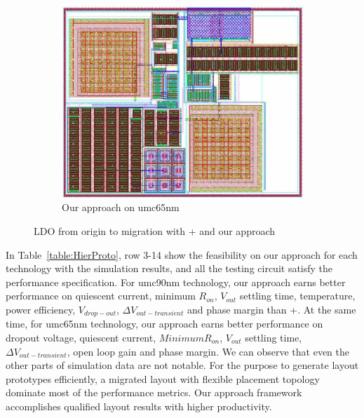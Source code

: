 \begin{figure}[ht]
\begin{subfigure}[t]{0.4\textwidth}
      \includegraphics[width=\textwidth]{Fig/LDO_umc65_PlFxRtCDT.eps}
      \caption{Our approach on umc65nm }\label{subfig:LDO_umc65_PlFxRtCDT}  
      \end{subfigure}
    \caption{LDO from origin to migration with \cite{msc-bhattacharya-tcad06}+\cite{Chin_DMR_ICCAD2013} and our approach}\label{fig:LDO}
    \end{figure}


    

    In Table~\ref{table:HierProto}, row 3-14 show the feasibility on our approach for each technology with the simulation results, and all the testing circuit satisfy the performance specification. For umc90nm technology, our approach earns better performance on quiescent current, minimum $R_{on}$, $V_{out}$ settling time, temperature, power efficiency, $V_{drop-out}$, $\Delta V_{out-transient}$ and phase margin than \cite{msc-bhattacharya-tcad06}+\cite{Chin_DMR_ICCAD2013}. At the same time, for umc65nm technology, our approach earns better performance on dropout voltage, quiescent current, $Minimum R_{on}$, $V_{out}$ settling time, $\Delta V_{out-transient}$, open loop gain and phase margin. We can observe that even the other parts of simulation data are not notable. For the purpose to generate layout prototypes efficiently, a migrated layout with flexible placement topology dominate most of the performance metrics. Our approach framework accomplishes qualified layout results with higher productivity.

